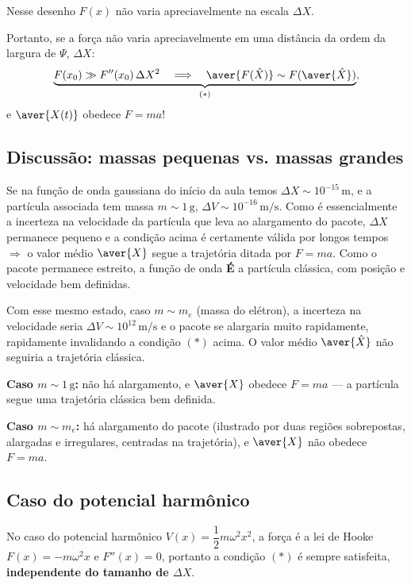 Nesse desenho $F(x)$ não varia apreciavelmente na escala $\Delta X$.

Portanto, se a força não varia apreciavelmente em uma distância da ordem da largura de $\Psi$, $\Delta X$:
\begin{equation}
    \underbrace{F(x_0) \gg F''(x_0)\,\Delta X^2 \quad \Longrightarrow \quad \aver{F(\hat{X})} \sim F(\aver{\hat{X}})}_{(*)},
\label{eq:aula15_condicao_estrela}
\end{equation}
e $\aver{X(t)}$ obedece $F = ma$!

\subsection*{Discussão: massas pequenas vs. massas grandes}

Se na função de onda gaussiana do início da aula temos $\Delta X \sim 10^{-15}\,\text{m}$, e a partícula associada tem massa $m \sim 1\,\text{g}$, $\Delta V \sim 10^{-16}\,\text{m/s}$. Como é essencialmente a incerteza na velocidade da partícula que leva ao alargamento do pacote, $\Delta X$ permanece pequeno e a condição acima é certamente válida por longos tempos $\Rightarrow$ o valor médio $\aver{X}$ segue a trajetória ditada por $F = ma$. Como o pacote permanece estreito, a função de onda \textbf{É} a partícula clássica, com posição e velocidade bem definidas.

Com esse mesmo estado, caso $m \sim m_e$ (massa do elétron), a incerteza na velocidade seria $\Delta V \sim 10^{12}\,\text{m/s}$ e o pacote se alargaria muito rapidamente, rapidamente invalidando a condição $(*)$ acima. O valor médio $\aver{\hat{X}}$ não seguiria a trajetória clássica.

\textbf{Caso $m \sim 1\,\text{g}$:} não há alargamento, e $\aver{X}$ obedece $F = ma$ — a partícula segue uma trajetória clássica bem definida.

\textbf{Caso $m \sim m_e$:} há alargamento do pacote (ilustrado por duas regiões sobrepostas, alargadas e irregulares, centradas na trajetória), e $\aver{X}$ não obedece $F = ma$.

\subsection*{Caso do potencial harmônico}

No caso do potencial harmônico $V(x) = \dfrac{1}{2}m\omega^2 x^2$, a força é a lei de Hooke $F(x) = -m\omega^2 x$ e $F''(x) = 0$, portanto a condição $(*)$ é sempre satisfeita, \textbf{independente do tamanho de $\Delta X$}.

